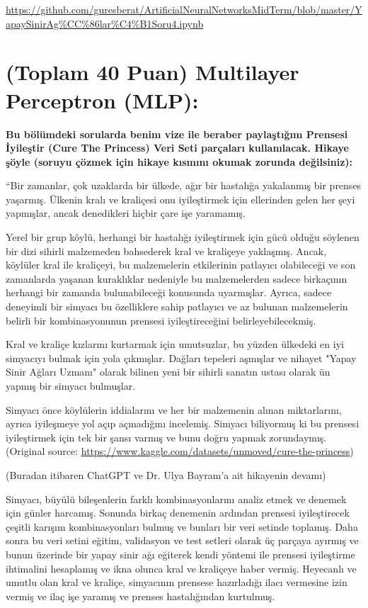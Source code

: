 \documentclass[11pt]{article}
\begin{document}
\url{https://github.com/guresberat/ArtificialNeuralNetworksMidTerm/blob/master/YapaySinirAg%CC%86lar%C4%B1Soru4.ipynb}

\section{(Toplam 40 Puan) Multilayer Perceptron (MLP):} 
\textbf{Bu bölümdeki sorularda benim vize ile beraber paylaştığım Prensesi İyileştir (Cure The Princess) Veri Seti parçaları kullanılacak. Hikaye şöyle (soruyu çözmek için hikaye kısmını okumak zorunda değilsiniz):} 

``Bir zamanlar, çok uzaklarda bir ülkede, ağır bir hastalığa yakalanmış bir prenses yaşarmış. Ülkenin kralı ve kraliçesi onu iyileştirmek için ellerinden gelen her şeyi yapmışlar, ancak denedikleri hiçbir çare işe yaramamış.

Yerel bir grup köylü, herhangi bir hastalığı iyileştirmek için gücü olduğu söylenen bir dizi sihirli malzemeden bahsederek kral ve kraliçeye yaklaşmış. Ancak, köylüler kral ile kraliçeyi, bu malzemelerin etkilerinin patlayıcı olabileceği ve son zamanlarda yaşanan kuraklıklar nedeniyle bu malzemelerden sadece birkaçının herhangi bir zamanda bulunabileceği konusunda uyarmışlar. Ayrıca, sadece deneyimli bir simyacı bu özelliklere sahip patlayıcı ve az bulunan malzemelerin belirli bir kombinasyonunun prensesi iyileştireceğini belirleyebilecekmiş.

Kral ve kraliçe kızlarını kurtarmak için umutsuzlar, bu yüzden ülkedeki en iyi simyacıyı bulmak için yola çıkmışlar. Dağları tepeleri aşmışlar ve nihayet "Yapay Sinir Ağları Uzmanı" olarak bilinen yeni bir sihirli sanatın ustası olarak ün yapmış bir simyacı bulmuşlar.

Simyacı önce köylülerin iddialarını ve her bir malzemenin alınan miktarlarını, ayrıca iyileşmeye yol açıp açmadığını incelemiş. Simyacı biliyormuş ki bu prensesi iyileştirmek için tek bir şansı varmış ve bunu doğru yapmak zorundaymış. (Original source: \url{https://www.kaggle.com/datasets/unmoved/cure-the-princess})

(Buradan itibaren ChatGPT ve Dr. Ulya Bayram'a ait hikayenin devamı)

Simyacı, büyülü bileşenlerin farklı kombinasyonlarını analiz etmek ve denemek için günler harcamış. Sonunda birkaç denemenin ardından prensesi iyileştirecek çeşitli karışım kombinasyonları bulmuş ve bunları bir veri setinde toplamış. Daha sonra bu veri setini eğitim, validasyon ve test setleri olarak üç parçaya ayırmış ve bunun üzerinde bir yapay sinir ağı eğiterek kendi yöntemi ile prensesi iyileştirme ihtimalini hesaplamış ve ikna olunca kral ve kraliçeye haber vermiş. Heyecanlı ve umutlu olan kral ve kraliçe, simyacının prensese hazırladığı ilacı vermesine izin vermiş ve ilaç işe yaramış ve prenses hastalığından kurtulmuş.
\end{document}

